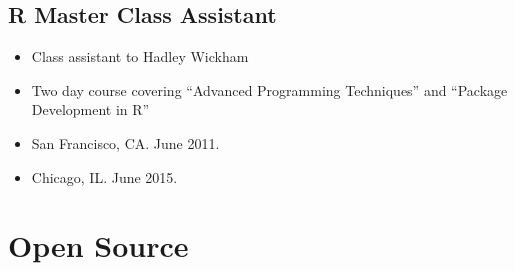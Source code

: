 \documentclass[oneside]{article}
\begin{document}

  \subsection{R Master Class Assistant}

    \begin{itemize}
      \item Class assistant to Hadley Wickham
      \item Two day course covering ``Advanced Programming Techniques'' and ``Package Development in R''
      \item San Francisco, CA. June 2011.
      \item Chicago, IL. June 2015.
    \end{itemize}


\section{Open Source}
\end{document}
